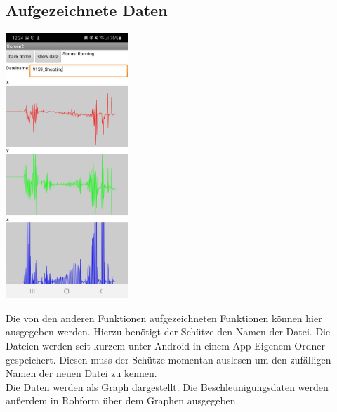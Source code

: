 \subsection{Aufgezeichnete Daten}
    \begin{minipage}{0.5\textwidth}
        \includegraphics[height=10cm]{Bilder/GraphRec.jpg}
    \end{minipage}
    \hfill
    \begin{minipage}{0.5\textwidth}
        Die von den anderen Funktionen aufgezeichneten Funktionen können hier ausgegeben
        werden. Hierzu benötigt der Schütze den Namen der Datei. Die Dateien werden
        seit kurzem unter Android in einem App-Eigenem Ordner gespeichert. Diesen muss
        der Schütze momentan auslesen um den zufälligen Namen der neuen Datei zu kennen.\\
        Die Daten werden als Graph dargestellt. Die Beschleunigungsdaten werden außerdem
        in Rohform über dem Graphen ausgegeben.\\
    \end{minipage}
